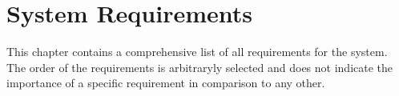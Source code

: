 \chapter{System Requirements}
This chapter contains a comprehensive list of all requirements for the system. 
The order of the requirements is arbitraryly selected and does not indicate the importance
of a specific requirement in comparison to any other.